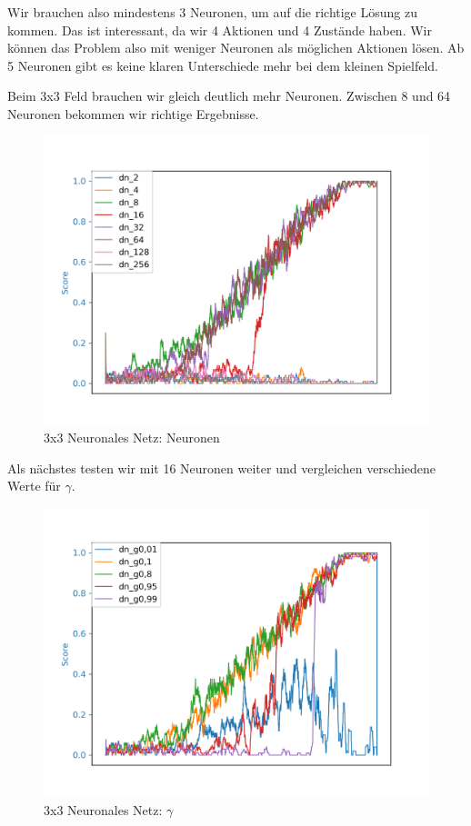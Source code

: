 Wir brauchen also mindestens 3 Neuronen, um auf die richtige Lösung zu kommen. Das ist interessant, da wir 4 Aktionen und 4 Zustände haben. Wir können das Problem also mit weniger Neuronen als möglichen Aktionen lösen. Ab 5 Neuronen gibt es keine klaren Unterschiede mehr bei dem kleinen Spielfeld.

Beim 3x3 Feld brauchen wir gleich deutlich mehr Neuronen. Zwischen 8 und 64 Neuronen bekommen wir richtige Ergebnisse.

\begin{figure}[H]
\centering
\includegraphics[width=\textwidth]{Figures/3x3_dn_2_dn_4_dn_8_dn_16_dn_32_dn_64_dn_128_dn_256.png}
\caption{3x3 Neuronales Netz: Neuronen}
\label{dn2}
\end{figure}

Als nächstes testen wir mit 16 Neuronen weiter und vergleichen verschiedene Werte für $\gamma$.

\begin{figure}[H]
\centering
\includegraphics[width=\textwidth]{Figures/3x3_dn_g0,01_dn_g0,1_dn_g0,8_dn_g0,95_dn_g0,99.png}
\caption{3x3 Neuronales Netz: $\gamma$}
\label{dn3}
\end{figure}


